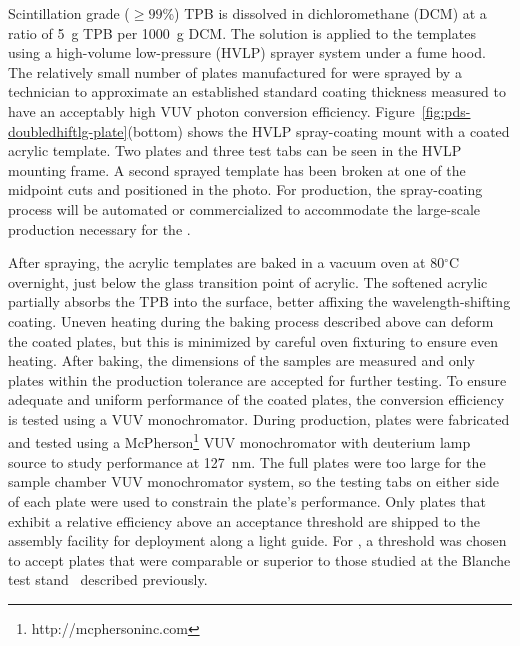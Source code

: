 Scintillation grade ($\ge 99$\%) TPB is dissolved in dichloromethane (DCM) at a ratio of \SI{5}{g} TPB per \SI{1000}{g} DCM. The solution is applied to the templates using a high-volume low-pressure (HVLP) sprayer system under a fume hood. The relatively small number of plates manufactured for  were sprayed by a technician to approximate an established standard coating thickness measured to have an acceptably high VUV photon conversion efficiency. Figure~\ref{fig:pds-doubledhiftlg-plate}(bottom) shows the HVLP spray-coating mount with a coated acrylic template. Two plates and three test tabs can be seen in the HVLP mounting frame. A second sprayed template has been broken at one of the midpoint cuts and positioned in the photo. For  production, the spray-coating process will be automated or commercialized to accommodate the large-scale production necessary for the  .

After spraying, the acrylic templates are baked in a vacuum oven at 80$^{\circ}$C overnight, just below the glass transition point of acrylic. The softened acrylic partially absorbs the TPB into the surface, better affixing the wavelength-shifting coating. Uneven heating during the baking process described above can deform the coated plates, but this is minimized by careful oven fixturing to ensure even heating. After baking, the dimensions of the samples are measured and only plates within the production tolerance are accepted for further testing.
To ensure adequate and uniform performance of the coated plates, the conversion efficiency is tested using a VUV monochromator. During  production, plates were fabricated and tested 
using a McPherson\footnote{http://mcphersoninc.com} VUV monochromator with deuterium lamp source to study performance at \SI{127}{nm}. The full plates were too large for the sample chamber
VUV monochromator system, so the testing tabs on either side of each plate were used to constrain the plate's performance. 
Only plates that exhibit a relative efficiency above an acceptance threshold are shipped to the assembly facility for deployment along a light guide. For , a threshold was chosen to accept plates that were comparable or superior to those studied at the Blanche test stand~\cite{bib:DoubleShiftLG-NIM-171113} described previously.

